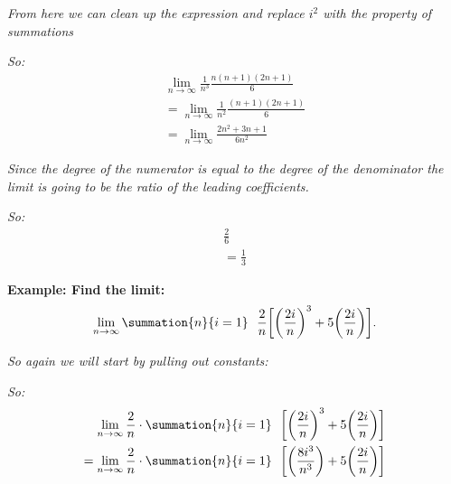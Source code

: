 \documentclass{report}
\begin{document}
\bigbreak \noindent 
\textit{From here we can clean up the expression and replace $i^{2}$ with the property of summations}

\bigbreak \noindent
\textit{So:}
\begin{align*}
  \lim_{n \to \infty}{\frac{1}{n^{3}} \frac{n(n+1)(2n+1)}{6}} \\
  =\lim_{n \to \infty}{\frac{1}{n^{2}} \frac{(n+1)(2n+1)}{6}} \\
  = \lim_{n \to \infty}{\frac{2n^{2}+3n+1}{6n^{2}}}
\end{align*}

\bigbreak \noindent 
\textit{Since the degree of the numerator is equal to the degree of the denominator the limit is going to be the 
  ratio of the leading coefficients.
}

\bigbreak \noindent
\textit{So:}
\begin{align*}
  \frac{2}{6} \\
  \boxed{= \frac{1}{3}}
\end{align*}

\pagebreak \bigbreak \noindent
\begin{mdframed}
  \textbf{Example: Find the limit:}
  \begin{align*}
    \lim_{n \to \infty}{\summation{n}{i=1}\ \ \frac{2}{n}\bigg[\bigg(\frac{2i}{n}\bigg)^{3} + 5 \bigg(\frac{2i}{n}\bigg)\bigg]}       
  .\end{align*}
\end{mdframed}

\bigbreak \noindent 
\textit{So again we will start by pulling out constants:}

\bigbreak \noindent
\textit{So:}
\begin{align*}
  \lim_{n \to \infty}{\frac{2}{n} \cdot \summation{n}{i=1}\ \ \bigg[\bigg(\frac{2i}{n}\bigg)^{3} + 5 \bigg(\frac{2i}{n}\bigg)\bigg]}\\
  =\lim_{n \to \infty}{\frac{2}{n} \cdot \summation{n}{i=1}\ \ \bigg[\bigg(\frac{8i^{3}}{n^{3}}\bigg) + 5 \bigg(\frac{2i}{n}\bigg)\bigg]}\\
\end{align*}
\end{document}
